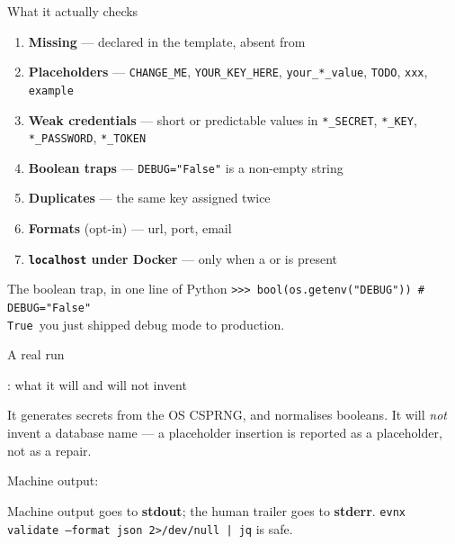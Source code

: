 \begin{frame}{What it actually checks}
  \begin{enumerate}
    \item \textbf{Missing} — declared in the template, absent from 
    \item \textbf{Placeholders} — \texttt{CHANGE\_ME}, \texttt{YOUR\_KEY\_HERE},
          \texttt{your\_*\_value}, \texttt{TODO}, \texttt{xxx}, \texttt{example}
    \item \textbf{Weak credentials} — short or predictable values in
          \texttt{*\_SECRET}, \texttt{*\_KEY}, \texttt{*\_PASSWORD}, \texttt{*\_TOKEN}
    \item \textbf{Boolean traps} — \texttt{DEBUG="False"} is a non-empty string
    \item \textbf{Duplicates} — the same key assigned twice
    \item \textbf{Formats} (opt-in) — url, port, email
    \item \textbf{\texttt{localhost} under Docker} — only when a
           or  is present
  \end{enumerate}

  \vspace{0.6em}
  \begin{alertblock}{The boolean trap, in one line of Python}
    \texttt{>>> bool(os.getenv("DEBUG"))  \# DEBUG="False"} \\
    \texttt{True}\quad\textemdash\ you just shipped debug mode to production.
  \end{alertblock}
\end{frame}

\begin{frame}[fragile]{A real run}
\end{frame}

\begin{frame}[fragile]{: what it will and will not invent}

  {\footnotesize It generates secrets from the OS CSPRNG, and normalises booleans.
  It will \emph{not} invent a database name — a placeholder insertion is reported
  as a placeholder, not as a repair.}
\end{frame}

\begin{frame}[fragile]{Machine output: }

  {\footnotesize Machine output goes to \textbf{stdout}; the human trailer goes to
  \textbf{stderr}. \texttt{evnx validate --format json 2>/dev/null | jq} is safe.}
\end{frame}

